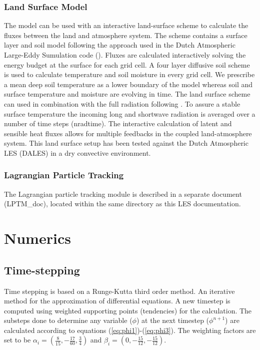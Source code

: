 \documentclass[11pt,a4paper]{article}
\begin{document}
\subsubsection{Land Surface Model}
The model can be used with an interactive land-surface scheme to calculate
the fluxes between the land and atmosphere system.
The scheme contains a surface layer and soil model following the approach
used in the Dutch Atmospheric Large-Eddy Sumulation code (\cite{Heus:2010}).
Fluxes are calculated interactively solving the energy budget at the surface for
each grid cell.
A four layer diffusive soil scheme is used to calculate temperature and soil
moisture in every grid cell.
We prescribe a mean deep soil temperature as a lower boundary of the model
whereas soil and surface temperature and moisture are evolving in time.
The land surface scheme can used in combination with the full radiation 
following \cite{Pincus:2009}.
To assure a stable surface temperature the incoming long and shortwave
radiation is averaged over a number of time steps (nradtime).
The interactive calculation of latent and sensible heat fluxes allows for multiple
feedbacks in the coupled land-atmosphere system.
This land surface setup has been tested against the Dutch Atmospheric 
LES (DALES) in a dry convective environment.

\subsubsection{Lagrangian Particle Tracking}
The Lagrangian particle tracking module is described in a separate document (LPTM\_doc), located within the same directory as this LES documentation.

\section{Numerics}

\subsection{Time-stepping}
Time stepping is based on a Runge-Kutta third order method.
An iterative method for the approximation of differential equations.
A new timestep is computed using weighted supporting points (tendencies) for the calculation.
The substeps done to determine any variable ($\phi$) at the next timestep ($\phi^{n+1}$) are
calculated according to equations (\ref{eq:phi1})-(\ref{eq:phi3}).
The weighting factors are set to be $\alpha_i = (\frac{8}{15}, -\frac{17}{60}, \frac{3}{4})$
and $\beta_i = (0, -\frac{15}{12}, -\frac{15}{12})$. 
\end{document}
